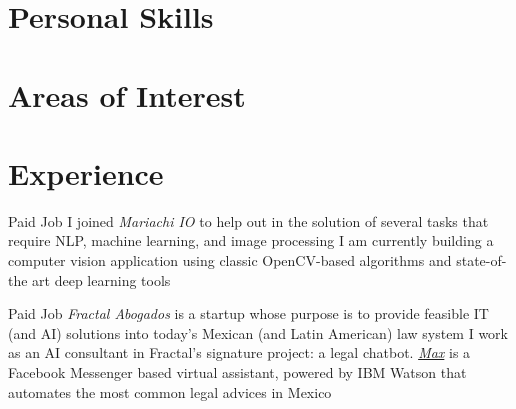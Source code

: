 \documentclass[11pt,a4paper,sans]{moderncv} %
\begin{document}
\section{Personal Skills}

\section{Areas of Interest}


\section{Experience}

        {Paid Job}
        {I joined \emph{Mariachi IO} to help out in the solution of several tasks that require NLP, machine learning, and image processing}
        {I am currently building a computer vision application using classic OpenCV-based algorithms and state-of-the art deep learning tools}
        {}
        {}

        {Paid Job}
        {\emph{Fractal Abogados} is a startup whose purpose is to provide feasible IT (and AI) solutions into today's Mexican (and Latin American) law system}
        {I work as an AI consultant in Fractal's signature project: a legal chatbot. \href{https://m.me/fractal-abogados}{\emph{Max}} is a Facebook Messenger based virtual assistant, powered by IBM Watson that automates the most common legal advices in Mexico}
        {}
        {}
\end{document}
